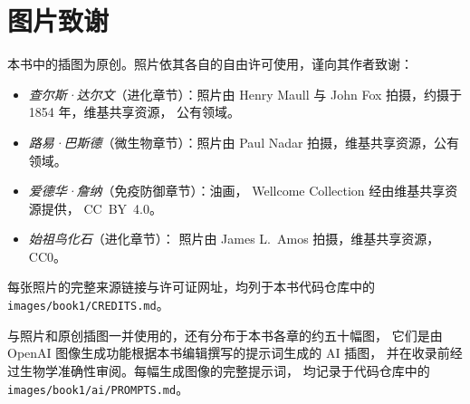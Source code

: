 \chapter*{图片致谢}

本书中的插图为原创。照片依其各自的自由许可使用，谨向其作者致谢：

\begin{itemize}
  \item \emph{查尔斯·达尔文}（进化章节）：照片由
        Henry Maull 与 John Fox 拍摄，约摄于 1854 年，维基共享资源，
        公有领域。
  \item \emph{路易·巴斯德}（微生物章节）：照片由
        Paul Nadar 拍摄，维基共享资源，公有领域。
  \item \emph{爱德华·詹纳}（免疫防御章节）：油画，
        Wellcome Collection 经由维基共享资源提供，
        CC~BY~4.0。
  \item \emph{始祖鸟化石}（进化章节）：
        照片由 James L.~Amos 拍摄，维基共享资源，CC0。
\end{itemize}

每张照片的完整来源链接与许可证网址，均列于本书代码仓库中的
\texttt{images/book1/CREDITS.md}。

\bigskip
与照片和原创插图一并使用的，还有分布于本书各章的约五十幅图，
它们是由 OpenAI 图像生成功能根据本书编辑撰写的提示词生成的 AI 插图，
并在收录前经过生物学准确性审阅。每幅生成图像的完整提示词，
均记录于代码仓库中的 \texttt{images/book1/ai/PROMPTS.md}。
\clearpage
